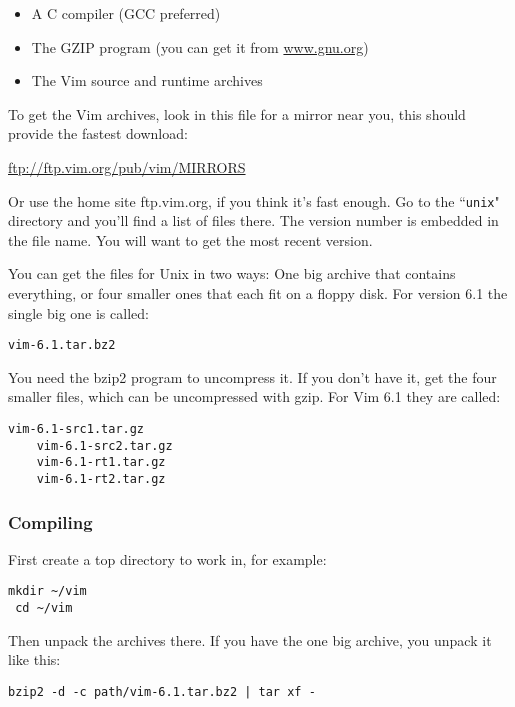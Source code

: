 \begin{itemize}
    \item A C compiler (GCC preferred)
    \item The GZIP program (you can get it from \url{www.gnu.org})
    \item The Vim source and runtime archives
\end{itemize}

To get the Vim archives, look in this file for a mirror near you, this should provide the fastest download:

    \url{ftp://ftp.vim.org/pub/vim/MIRRORS} 

Or use the home site ftp.vim.org, if you think it's fast enough.
Go to the ``\texttt{unix}" directory and you'll find a list of files there.
The version number is embedded in the file name.
You will want to get the most recent version.

You can get the files for Unix in two ways: One big archive that contains everything, or four smaller ones that each fit on a floppy disk.
For version 6.1 the single big one is called:

\begin{Verbatim}[samepage=true]
    vim-6.1.tar.bz2 
\end{Verbatim}

You need the bzip2 program to uncompress it.
If you don't have it, get the four smaller files, which can be uncompressed with gzip.
For Vim 6.1 they are called:

\begin{Verbatim}[samepage=true]
    vim-6.1-src1.tar.gz 
    vim-6.1-src2.tar.gz 
    vim-6.1-rt1.tar.gz 
    vim-6.1-rt2.tar.gz 
\end{Verbatim}

\subsubsection{Compiling}
First create a top directory to work in, for example:

\begin{Verbatim}[samepage=true]
 mkdir ~/vim
 cd ~/vim
\end{Verbatim}

Then unpack the archives there.
If you have the one big archive, you unpack it like this:

\begin{Verbatim}[samepage=true]
 bzip2 -d -c path/vim-6.1.tar.bz2 | tar xf -
\end{Verbatim}

